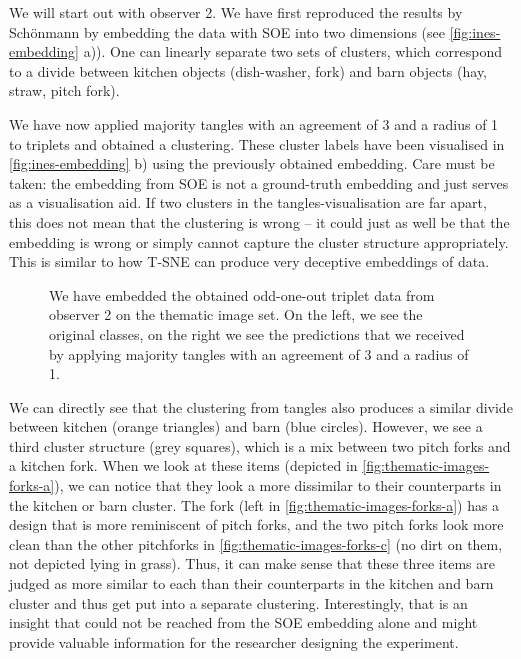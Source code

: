 We will start out with observer 2. We have first reproduced the results by Schönmann by embedding the data with SOE into two dimensions 
(see \autoref{fig:ines-embedding} a)). One can linearly separate two sets of clusters, which correspond to a divide between kitchen objects 
(dish-washer, fork) and barn objects (hay, straw, pitch fork). 

We have now applied majority tangles with an agreement of 3 and a radius of 1 to triplets and obtained a clustering. These cluster labels 
have been visualised in \autoref{fig:ines-embedding} b) using the previously obtained embedding. Care must be taken: the embedding
from SOE is not a ground-truth embedding and just serves as a visualisation aid. If two clusters in the tangles-visualisation are far 
apart, this does not mean that the clustering is wrong – it could just as well be that the embedding is wrong or simply cannot capture
the cluster structure appropriately. This is similar to how T-SNE can produce very deceptive embeddings of data.

\onecolumn
\begin{figure}[ht]
    \centering
    \caption{
        We have embedded the obtained odd-one-out triplet data from observer 2 on the thematic image set.
        On the left, we see the original classes, on the right we see the predictions that we received by
        applying majority tangles with an agreement of 3 and a radius of 1.
    }
    \label{fig:ines-embedding}
\end{figure}


We can directly see that the clustering from tangles also produces a similar divide between kitchen (orange triangles) and barn (blue circles). 
However, we see a third cluster structure (grey squares), which is a mix between two pitch forks and a kitchen fork. 
When we look at these items (depicted in \autoref{fig:thematic-images-forks-a}), we can notice that they look a more dissimilar to their
counterparts in the kitchen or barn cluster. The fork (left in \autoref{fig:thematic-images-forks-a}) has a design that is more reminiscent of pitch forks, and the two pitch forks
look more clean than the other pitchforks in \autoref{fig:thematic-images-forks-c} (no dirt on them, not depicted lying in grass). Thus, it can make sense that these three items are judged
as more similar to each than their counterparts in the kitchen and barn cluster and thus get put into a separate clustering. Interestingly, that is an insight that could not be reached from the 
SOE embedding alone and might provide valuable information for the researcher designing the experiment.

